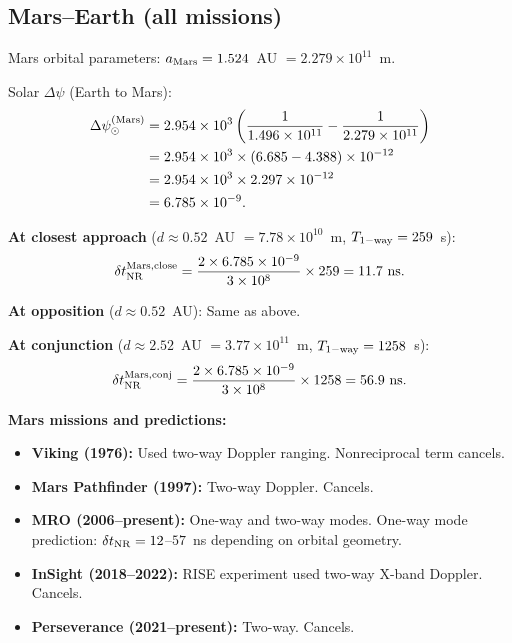 \documentclass[aps,prl,twocolumn,superscriptaddress,showpacs]{revtex4-2}
\begin{document}
\subsection{Mars--Earth (all missions)}

Mars orbital parameters: $a_{\rm Mars} = 1.524$~AU $= 2.279\times 10^{11}$~m.

Solar $\Delta\psi$ (Earth to Mars):
\begin{align}
\Delta\psi_\odot^{(\rm Mars)} &= 2.954\times 10^3
\left(\frac{1}{1.496\times 10^{11}} - \frac{1}{2.279\times 10^{11}}\right) \nonumber\\
&= 2.954\times 10^3\times(6.685 - 4.388)\times 10^{-12} \nonumber\\
&= 2.954\times 10^3\times 2.297\times 10^{-12} \nonumber\\
&= 6.785\times 10^{-9}.
\end{align}

\textbf{At closest approach} ($d \approx 0.52$~AU $= 7.78\times 10^{10}$~m,
$T_{\rm 1-way} = 259$~s):
\begin{equation}
\delta t_{\rm NR}^{\rm Mars,close} = \frac{2\times 6.785\times 10^{-9}}{3\times 10^8}
\times 259 = 11.7~\text{ns}.
\end{equation}

\textbf{At opposition} ($d \approx 0.52$~AU): Same as above.

\textbf{At conjunction} ($d \approx 2.52$~AU $= 3.77\times 10^{11}$~m,
$T_{\rm 1-way} = 1258$~s):
\begin{equation}
\delta t_{\rm NR}^{\rm Mars,conj} = \frac{2\times 6.785\times 10^{-9}}{3\times 10^8}
\times 1258 = 56.9~\text{ns}.
\end{equation}

\textbf{Mars missions and predictions:}
\begin{itemize}
\item \textbf{Viking (1976):} Used two-way Doppler ranging.
      Nonreciprocal term cancels.
\item \textbf{Mars Pathfinder (1997):} Two-way Doppler.  Cancels.
\item \textbf{MRO (2006--present):} One-way and two-way modes.
      One-way mode prediction: $\delta t_{\rm NR} = 12$--$57$~ns
      depending on orbital geometry.
\item \textbf{InSight (2018--2022):} RISE experiment used
      two-way X-band Doppler.  Cancels.
\item \textbf{Perseverance (2021--present):} Two-way.  Cancels.
\end{itemize}
\end{document}
